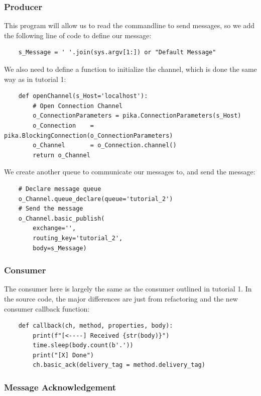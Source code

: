 \documentclass{article}
\begin{document}
\subsubsection{Producer}

This program will allow us to read the commandline to send messages, so we add the following line of code to define our message:

\begin{verbatim}
    s_Message = ' '.join(sys.argv[1:]) or "Default Message"
\end{verbatim}

We also need to define a function to initialize the channel, which is done the same way as in tutorial 1:

\begin{verbatim}
    def openChannel(s_Host='localhost'):
        # Open Connection Channel
        o_ConnectionParameters = pika.ConnectionParameters(s_Host)
        o_Connection    = pika.BlockingConnection(o_ConnectionParameters)
        o_Channel       = o_Connection.channel()
        return o_Channel
\end{verbatim}

We create another queue to communicate our messages to, and send the message:

\begin{verbatim}
    # Declare message queue
    o_Channel.queue_declare(queue='tutorial_2')
    # Send the message
    o_Channel.basic_publish(
        exchange='',
        routing_key='tutorial_2',
        body=s_Message)
\end{verbatim}

\subsubsection{Consumer}

The consumer here is largely the same as the consumer outlined in tutorial 1. In the source code, the major differences are just from refactoring and the new consumer callback function:

\begin{verbatim}
    def callback(ch, method, properties, body):
        print(f"[<----] Received {str(body)}")
        time.sleep(body.count(b'.'))
        print("[X] Done")
        ch.basic_ack(delivery_tag = method.delivery_tag)
\end{verbatim}

\subsubsection{Message Acknowledgement}
\end{document}
